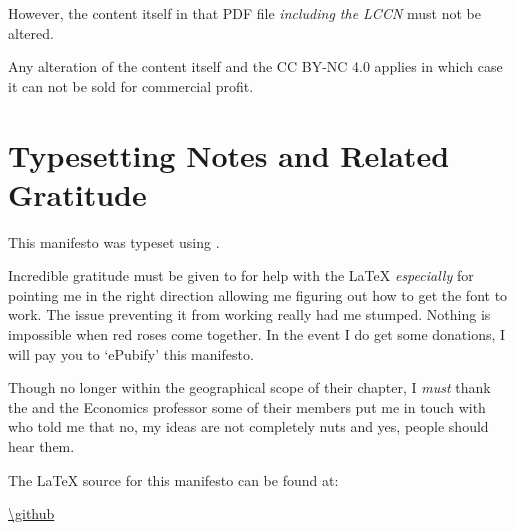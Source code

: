 However, the content itself in that PDF file \emph{including the LCCN} must not be altered.

Any alteration of the content itself and the CC BY-NC 4.0 applies in which case it can not be sold for commercial profit.

\clearpage

\section{Typesetting Notes and Related Gratitude}

This manifesto was typeset using .

\bigskip

\noindent Incredible gratitude must be given to  for help with the \LaTeX{} \emph{especially} for pointing me in the right direction allowing me figuring out how to get the  font to work. The issue preventing it from working really had me stumped. Nothing is impossible when red roses come together. In the event I do get some donations, I will pay you to `ePubify' this manifesto.

\bigskip

\noindent Though no longer within the geographical scope of their chapter, I \emph{must} thank the  and the Economics professor some of their members put me in touch with who told me that no, my ideas are not completely nuts and yes, people should hear them.

\bigskip

\noindent The \LaTeX{} source for this manifesto can be found at:

\bigskip

\url{\github} 

